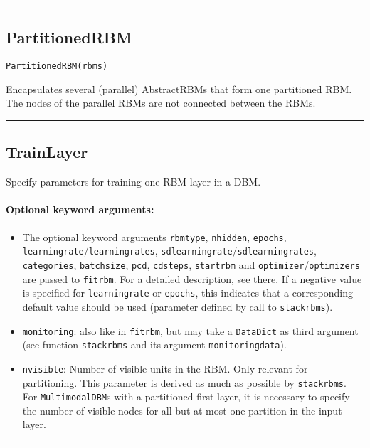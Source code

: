 \noindent\rule{\textwidth}{1pt}
\subsection*{PartitionedRBM}
\begin{verbatim}
PartitionedRBM(rbms)
\end{verbatim}
Encapsulates several (parallel) AbstractRBMs that form one partitioned RBM. The nodes of the parallel RBMs are not connected between the RBMs.

\noindent\rule{\textwidth}{1pt}
\subsection*{TrainLayer}
Specify parameters for training one RBM-layer in a DBM.

\paragraph*{Optional keyword arguments:}
\begin{itemize}
\item The optional keyword arguments \texttt{rbmtype}, \texttt{nhidden}, \texttt{epochs}, \texttt{learningrate}/\texttt{learningrates}, \texttt{sdlearningrate}/\texttt{sdlearningrates}, \texttt{categories}, \texttt{batchsize}, \texttt{pcd}, \texttt{cdsteps}, \texttt{startrbm} and \texttt{optimizer}/\texttt{optimizers} are passed to \texttt{fitrbm}. For a detailed description, see there. If a negative value is specified for \texttt{learningrate} or \texttt{epochs}, this indicates that a corresponding default value should be used (parameter defined by call to \texttt{stackrbms}).


\item \texttt{monitoring}: also like in \texttt{fitrbm}, but may take a \texttt{DataDict} as third argument  (see function \texttt{stackrbms} and its argument \texttt{monitoringdata}).


\item \texttt{nvisible}: Number of visible units in the RBM. Only relevant for partitioning.  This parameter is derived as much as possible by \texttt{stackrbms}.  For \texttt{MultimodalDBM}s with a partitioned first layer, it is necessary to specify  the number of visible nodes for all but at most one partition in the input layer.

\end{itemize}
\noindent\rule{\textwidth}{1pt}
